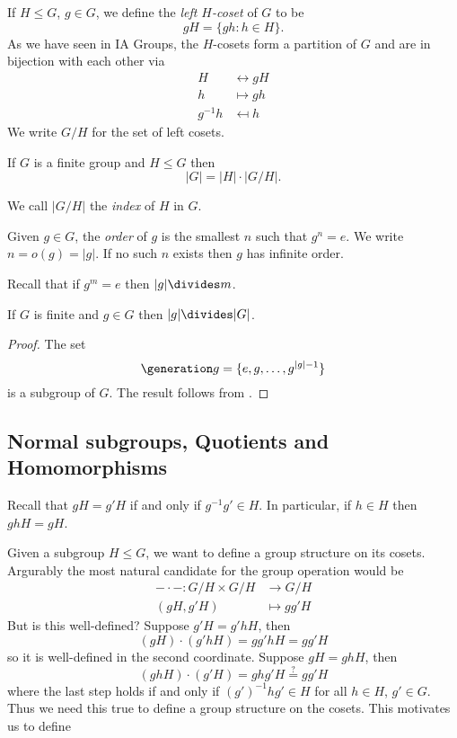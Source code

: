 \documentclass[a4paper]{article}
\theoremstyle{definition}
\begin{document}
If \(H \leq G\), \(g \in G\), we define the \emph{left \(H\)-coset} of \(G\) to be
\[
  gH = \{gh: h \in H\}.
\]
As we have seen in IA Groups, the \(H\)-cosets form a partition of \(G\) and are in bijection with each other via
\begin{align*}
  H &\leftrightarrow gH \\
  h &\mapsto gh \\
  g^{-1}h &\mapsfrom h
\end{align*}
We write \(G/H\) for the set of left cosets.

\begin{theorem}[Lagrange]
  \label{thm:lagrange}
  If \(G\) is a finite group and \(H \leq G \) then
  \[
    |G| = |H| \cdot |G/H|.
  \]
\end{theorem}

We call \(|G/H|\) the \emph{index} of \(H\) in \(G\).

\begin{definition}[Order]
  Given \(g \in G\), the \emph{order} of \(g\) is the smallest \(n\) such that \(g^n = e\). We write \(n = o(g) = |g|\). If no such \(n\) exists then \(g\) has infinite order.
\end{definition}

Recall that if \(g^m = e\) then \(|g| \divides m\).

\begin{lemma}
  If \(G\) is finite and \(g \in G\) then \(|g| \divides |G|\).
\end{lemma}

\begin{proof}
  The set
  \[
    \generation g = \{e, g, \dots, g^{|g| - 1}\}
  \]
  is a subgroup of \(G\). The result follows from .
\end{proof}

\subsection{Normal subgroups, Quotients and Homomorphisms}

Recall that \(gH = g'H\) if and only if \(g^{-1}g' \in H\). In particular, if \(h \in H\) then \(ghH = gH\).

Given a subgroup \(H \leq G\), we want to define a group structure on its cosets. Argurably the most natural candidate for the group operation would be
\begin{align*}
  - \cdot -: G/H \times G/H & \to G/H \\
  (gH, g'H) &\mapsto gg'H
\end{align*}
But is this well-defined? Suppose \(g'H = g'hH\), then
\[
  (gH) \cdot (g'hH) = gg'hH = gg'H
\]
so it is well-defined in the second coordinate. Suppose \(gH = ghH\), then
\[
  (ghH) \cdot (g'H) = ghg' H \stackrel{?}{=} gg'H
\]
where the last step holds if and only if \((g')^{-1}hg' \in H\) for all \(h \in H\), \(g' \in G\). Thus we need this true to define a group structure on the cosets. This motivates us to define
\end{document}
